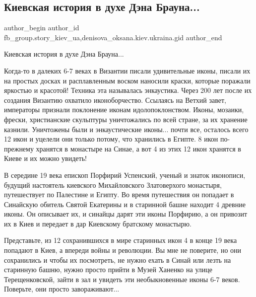  
 
 
 
 
 
\subsection{Киевская история в духе Дэна Брауна...}
\label{sec:27_10_2021.fb.fb_group.story_kiev_ua.1.ikony_vizantia}
 
\ifcmt
 author_begin
   author_id fb_group.story_kiev_ua,denisova_oksana.kiev.ukraina.gid
 author_end
\fi

Киевская история в духе Дэна Брауна... 

Когда-то в далеких 6-7 веках в Византии писали удивительные иконы, писали их на
простых досках и расплавленным воском наносили краски, которые поражали
яркостью и красотой! Техника эта называлась энкаустика. Через 200 лет после их
создания Византию охватило иконоборчество. Ссылаясь на Ветхий завет, императоры
признали поклонение иконам идолопоклонством. Иконы, мозаики, фрески,
христианские скульптуры уничтожались по всей стране, за их хранение казнили.
Уничтожены были и энкаустические иконы... почти все, осталось всего 12 икон и
уцелели  они только потому, что хранились в Египте. 8 икон по-прежнему хранятся
в монастыре на Синае, а вот 4 из этих 12 икон хранятся в Киеве и их можно
увидеть!


В середине 19 века епископ Порфирий Успенский, ученый и знаток  иконописи,
будущий настоятель киевского Михайловского Златоверхого монастыря, путешествует
по Палестине и Египту. Во время путешествия он  попадает в Синайскую обитель
Святой Екатерины и в старинной башне находит 4 древние иконы. Он описывает их,
и синайцы дарят эти иконы Порфирию, а он привозит их в Киев и передает в дар
Киевскому братскому монастырю. 

\begin{multicols}{2} %
\setlength{\parindent}{0pt}
\end{multicols} %

Представьте, из 12 сохранившихся в мире старинных икон  4 в конце 19 века
попадают в Киев, а впереди войны и революции. Вы мне не поверите, но они
сохранились и чтобы их посмотреть, не нужно ехать в Синай или лезть на
старинную башню, нужно просто прийти в Музей Ханенко на улице Терещенковской,
зайти в зал и увидеть эти  необыкновенные иконы 6-7 веков. Поверьте, они просто
завораживают...



